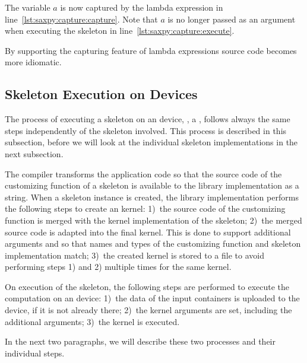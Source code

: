 The variable $a$ is now captured by the lambda expression in line~\ref{lst:saxpy:capture:capture}.
Note that $a$ is no longer passed as an argument when executing the skeleton in line~\ref{lst:saxpy:capture:execute}.

\vspace{1em}

By supporting the capturing feature of lambda expressions \SkelCL source code becomes more \Cpp idiomatic.








\subsection{Skeleton Execution on \OpenCL Devices}
\label{section:skelcl-library:execution}
The process of executing a skeleton on an \OpenCL device, \eg, a \GPU, follows always the same steps independently of the skeleton involved.
This process is described in this subsection, before we will look at the individual skeleton implementations in the next subsection.

The  compiler transforms the \SkelCL application code so that the source code of the customizing function of a skeleton is available to the \SkelCL library implementation as a string.
When a skeleton instance is created, the \SkelCL library implementation performs the following steps to create an \OpenCL kernel:
1)~the source code of the customizing function is merged with the \OpenCL kernel implementation of the skeleton;
2)~the merged source code is adapted into the final \OpenCL kernel. This is done to support additional arguments and so that names and types of the customizing function and skeleton implementation match;
3)~the created \OpenCL kernel is stored to a file to avoid performing steps 1) and 2) multiple times for the same kernel.

On execution of the skeleton, the following steps are performed to execute the computation on an \OpenCL device:
1)~the data of the input containers is uploaded to the \OpenCL device, if it is not already there;
2)~the \OpenCL kernel arguments are set, including the additional arguments;
3)~the \OpenCL kernel is executed.

In the next two paragraphs, we will describe these two processes and their individual steps.


